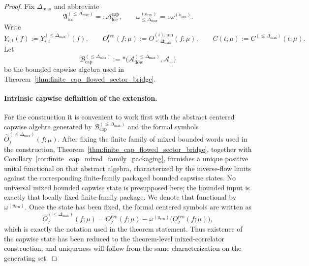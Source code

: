 \begin{proof}
Fix $\Delta_{\max}$ and abbreviate
\[
\mathfrak A_{\mathrm{loc}}^{(\le \Delta_{\max})}=:\mathcal A_{\mathrm{loc}}^{\mathrm{cap}},
\qquad
\omega_{\le \Delta_{\max}}^{(u_{\mathrm{ren}})}=:\omega^{(u_{\mathrm{ren}})}.
\]
Write
\[
Y_{i,t}(f):=Y^{(\le \Delta_{\max})}_{i,t}(f),
\qquad
O_i^{\mathrm{ren}}(f;\mu):=O^{(i),\mathrm{ren}}_{\le \Delta_{\max}}(f;\mu),
\qquad
C(t;\mu):=C^{(\le \Delta_{\max})}(t;\mu).
\]
Let
\[
\mathcal B_{\mathrm{cap}}^{(\le \Delta_{\max})}
:=
\ast\!\bigl(\mathcal A_{\mathrm{flow}}^{(\le \Delta_{\max})},\mathcal A_+\bigr)
\]
be the bounded capwise algebra used in Theorem~\ref{thm:finite_cap_flowed_sector_bridge}.

\paragraph{Intrinsic capwise definition of the extension.}
For the construction it is convenient to work first with the abstract centered capwise algebra generated by
$\mathcal B_{\mathrm{cap}}^{(\le \Delta_{\max})}$ and the formal symbols
$\widehat O_j^{(\le \Delta_{\max})}(f;\mu)$.
After fixing the finite family of mixed bounded words used in the construction, Theorem~\ref{thm:finite_cap_flowed_sector_bridge}, together with Corollary~\ref{cor:finite_cap_mixed_family_packaging}, furnishes a unique positive unital functional on that abstract algebra, characterized by the inverse-flow limits against the corresponding finite-family packaged bounded capwise states.
No universal mixed bounded capwise state is presupposed here; the bounded input is exactly that locally fixed finite-family package.
We denote that functional by $\omega^{(u_{\mathrm{ren}})}$.
Once the state has been fixed, the formal centered symbols are written as
\[
\widehat O_j^{(\le \Delta_{\max})}(f;\mu)
=
O_j^{\mathrm{ren}}(f;\mu)-\omega^{(u_{\mathrm{ren}})}\big(O_j^{\mathrm{ren}}(f;\mu)\big),
\]
which is exactly the notation used in the theorem statement.
Thus existence of the capwise state has been reduced to the theorem-level mixed-correlator construction, and uniqueness will follow from the same characterization on the generating set.


\end{proof}

